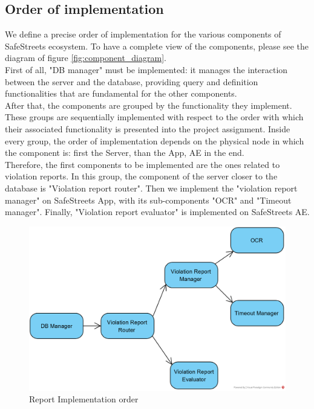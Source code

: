 \documentclass{article}
\begin{document}
		\subsection{Order of implementation}
		We define a precise order of implementation for the various components of SafeStreets ecosystem. To have a complete view of the components, please see the diagram of figure \ref{fig:component_diagram}.\\
		First of all, "DB manager" must be implemented: it manages the interaction between the server and the database, providing query and definition functionalities that are fundamental for the other components.\\
		After that, the components are grouped by the functionality they implement. These groups are sequentially implemented with respect to the order with which their associated functionality is presented into the project assignment. Inside every group, the order of implementation depends on the physical node in which the component is: first the Server, than the App, AE in the end.\\
		Therefore, the first components to be implemented are the ones related to violation reports. In this group, the component of the server closer to the database is "Violation report router". Then we implement the "violation report manager" on SafeStreets App, with its sub-components "OCR" and "Timeout manager". Finally, "Violation report evaluator" is implemented on SafeStreets AE.\\
		\begin{figure}[H]
			\includegraphics [scale=0.9] {diagrams/report_impltest.png}
			\caption[Report Implementation order]{Report Implementation order}
			\label{fig:report_order}
		\end{figure}
\end{document}
